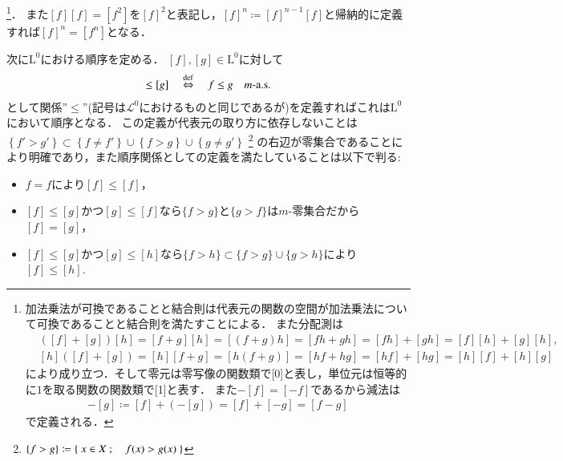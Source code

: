 \footnote{
	加法乗法が可換であることと結合則は代表元の関数の空間が加法乗法について可換であることと結合則を満たすことによる．
	また分配測は
	\begin{align}
		&([f]+[g])[h] = [f+g][h] = [(f+g)h] = [fh + gh] = [fh] + [gh] = [f][h] + [g][h], \\
		&[h]([f]+[g]) = [h][f+g] = [h(f+g)] = [hf + hg] = [hf] + [hg] = [h][f] + [h][g]
	\end{align}
	により成り立つ．そして零元は零写像の関数類で[0]と表し，単位元は恒等的に$1$を取る関数の関数類で[1]と表す．
	また$-[f] = [-f]$であるから減法は
	\begin{align}
		[f] - [g] \coloneqq [f] + (-[g]) = [f] + [-g] = [f - g]
	\end{align}
	で定義される．
}．
また$[f][f]=[f^2]$を$[f]^2$と表記し，$[f]^n \coloneqq [f]^{n-1}[f]$と帰納的に定義すれば$[f]^n=[f^n]$となる．

次に$\mathrm{L}^0$における順序を定める．
$[f],[g] \in \mathrm{L}^0$に対して
\begin{align}
	[f] \leq [g] \quad \DEF \quad f \leq g \quad \mbox{$m$-a.s.} 
\end{align}
として関係''$\leq$''(記号は$\mathscr{L}^0$におけるものと同じであるが)を定義すればこれは$\mathrm{L}^0$において順序となる．
この定義が代表元の取り方に依存しないことは
$\left\{ f' > g' \right\} \subset \left\{ f \neq f' \right\} \cup \left\{ f > g \right\} \cup \left\{ g \neq g' \right\}$
\footnote{
	$\left\{ f > g \right\} \coloneqq \left\{\ x \in X\ ;\quad f(x) > g(x)\ \right\}$
}
の右辺が零集合であることにより明確であり，また順序関係としての定義を満たしていることは以下で判る:
\begin{itemize}
	\item $f=f$により$[f] \leq [f]$，
	\item $[f] \leq [g]$かつ$[g] \leq [f]$なら$\{ f > g \}$と$\{ g > f \}$は$m$-零集合だから$[f]=[g]$，
	\item $[f] \leq [g]$かつ$[g] \leq [h]$なら$\{ f > h \} \subset \{ f > g \} \cup \{ g > h \}$により$[f]\leq[h]$.
\end{itemize}
	
